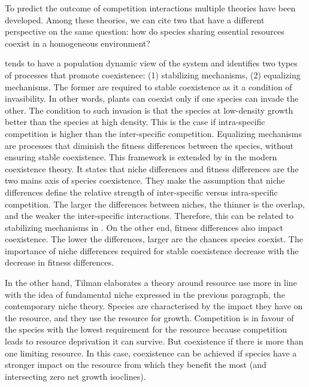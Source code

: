 To predict the outcome of competition interactions multiple theories have been developed. Among these theories, we can cite two that have a different perspective on the same question: how do species sharing essential resources coexist in a homogeneous environment?

\cite{chesson_mechanisms_2000} tends to have a population dynamic view of the system and identifies two types of processes that promote coexistence: (1) stabilizing mechanisms, (2) equalizing mechanisms. The former are required to stable coexistence as it a condition of invasibility. In other words, plants can coexist only if one species can invade the other. The condition to such invasion is that the species at low-density growth better than the species at high density. This is the case if intra-specific competition is higher than the inter-specific competition. Equalizing mechanisms are processes that diminish the fitness differences between the species, without ensuring stable coexistence. This framework is extended by \cite{adler_niche_2007} in the modern coexistence theory. It states that niche differences \parencite{levine_importance_2009} and fitness differences are the two mains axis of species coexistence. They make the assumption that niche differences define the relative strength of inter-specific versus intra-specific competition. The larger the differences between niches, the thinner is the overlap, and the weaker the inter-specific interactions. Therefore, this can be related to stabilizing mechanisms in \cite{chesson_general_2000}. On the other end, fitness differences also impact coexistence. The lower the differences, larger are the chances species coexist. The importance of niche differences required for stable coexistence decrease with the decrease in fitness differences.

In the other hand, Tilman elaborates a theory \cite{tilman_resource_1982, tilman_plant_1988} around resource use more in line with the idea of fundamental niche expressed in the previous paragraph, the contemporary niche theory. Species are characterised by the impact they have on the resource, and they use the resource for growth. Competition is in favour of the species with the lowest requirement for the resource because competition leads to resource deprivation it can survive. But coexistence if there is more than one limiting resource. In this case, coexistence can be achieved if species have a stronger impact on the resource from which they benefit the most (and intersecting zero net growth isoclines). 


